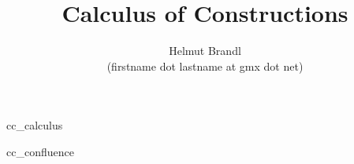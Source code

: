 \documentclass[12pt]{article}
\begin{document}


\title{Calculus of Constructions}
\author{Helmut Brandl \\ \scriptsize (firstname dot lastname at gmx dot net)}
\date{}

\maketitle

\abstract{
}



\tableofcontents

 {cc_calculus}

 {cc_confluence}




\end{document}
